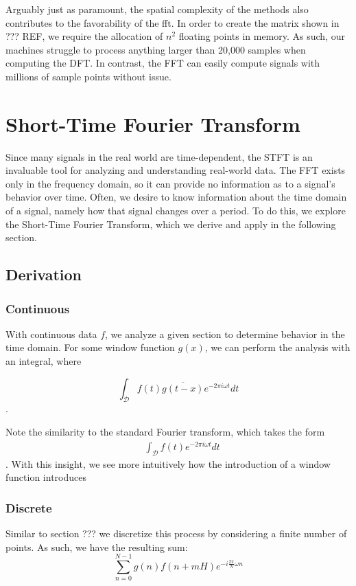 \documentclass[10pt]{article}
\begin{document}
Arguably just as paramount, the spatial complexity of the methods also contributes to the favorability of the fft. In order to create the matrix shown in ??? REF, we require the allocation of $n^2$ floating points in memory. As such, our machines struggle to process anything larger than 20,000 samples when computing the DFT. In contrast, the FFT can easily compute signals with millions of sample points without issue.\\

\section{Short-Time Fourier Transform}
Since many signals in the real world are time-dependent, the STFT is an invaluable tool for analyzing and understanding real-world data. The FFT exists only in the frequency domain, so it can provide no information as to a signal's behavior over time. Often, we desire to know information about the time domain of a signal, namely how that signal changes over a period. To do this, we explore the Short-Time Fourier Transform, which we derive and apply in the following section.\\
\subsection{Derivation}
\subsubsection{Continuous}
With continuous data $f$, we analyze a given section to determine behavior in the time domain. For some window function $g(x)$, we can perform the analysis with an integral, where 

\begin{equation}\label{continuous-stft}
    \int_\mathcal{D} f(t)\overline{g(t-x)}e^{-2\pi i \omega t} dt
\end{equation}.


Note the similarity to the standard Fourier transform, which takes the form \\
\begin{align*}
    &\int_\mathcal{D} f(t)e^{-2\pi i \omega t} dt
\end{align*}.
With this insight, we see more intuitively how the introduction of a window function introduces 
\subsubsection{Discrete}
Similar to section ??? we discretize this process by considering a finite number of points. As such, we have the resulting sum: \\
\begin{equation}\label{discrete-stft}
    \sum_{n=0}^{N-1}g(n)f(n+mH)e^{-i\frac{2\pi}{N}\omega n}
\end{equation}
\end{document}
